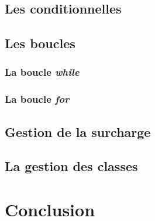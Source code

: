 \documentclass[12pt]{article}
\begin{document}
\subsection{Les conditionnelles}

\subsection{Les boucles}

\subsubsection{La boucle \em{while}}

\subsubsection{La boucle \em{for}}

\subsection{Gestion de la surcharge}

\subsection{La gestion des classes}

\section{Conclusion}
\end{document}
